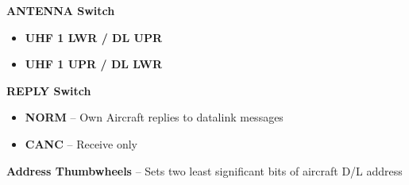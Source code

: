 \documentclass[fontSpartan]{TechCheck}
\begin{document}
\begin{tableitemize}
{\begin{subitemize}
\begin{itemize}
			\end{itemize}
			\item \textbf{ANTENNA Switch}
			\begin{itemize}
				\item \textbf{UHF 1 LWR / DL UPR}
				\item \textbf{UHF 1 UPR / DL LWR}
			\end{itemize}
			\item \textbf{REPLY Switch}
			\begin{itemize}
				\item \textbf{NORM} -- Own Aircraft replies to datalink messages
				\item\textbf{CANC} -- Receive only
			\end{itemize}
			\item \textbf{Address Thumbwheels} -- Sets two least significant bits of aircraft D/L address
		\end{subitemize}}
	\end{tableitemize}


	\clearpage
\end{document}
